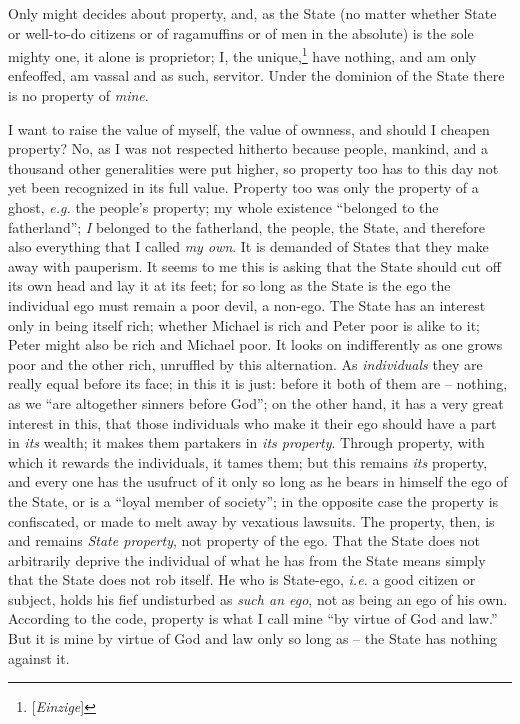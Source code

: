 Only might decides about property, and, as the State (no matter whether State 
or well-to-do citizens or of ragamuffins or of men in the absolute) is the 
sole mighty one, it alone is proprietor; I, the 
unique,\footnote{[\textit{Einzige}]} have nothing, and am only enfeoffed, am 
vassal and as such, servitor. Under the dominion of the State there is no 
property of \textit{mine}.

I want to raise the value of myself, the value of ownness, and should I 
cheapen property? No, as I was not respected hitherto because people, mankind, 
and a thousand other generalities were put higher, so property too has to this 
day not yet been recognized in its full value. Property too was only the 
property of a ghost, \textit{e.g.} the people's property; my whole existence 
``belonged to the fatherland''; \textit{I} belonged to the fatherland, the 
people, the State, and therefore also everything that I called \textit{my 
own}. It is demanded of States that they make away with pauperism. It seems to 
me this is asking that the State should cut off its own head and lay it at its 
feet; for so long as the State is the ego the individual ego must remain a 
poor devil, a non-ego. The State has an interest only in being itself rich; 
whether Michael is rich and Peter poor is alike to it; Peter might also be 
rich and Michael poor. It looks on indifferently as one grows poor and the 
other rich, unruffled by this alternation. As \textit{individuals} they are 
really equal before its face; in this it is just: before it both of them are 
-- nothing, as we ``are altogether sinners before God''; on the other hand, 
it has a very great interest in this, that those individuals who make it their 
ego should have a part in \textit{its} wealth; it makes them partakers in 
\textit{its property}. Through property, with which it rewards the 
individuals, it tames them; but this remains \textit{its} property, and every 
one has the usufruct of it only so long as he bears in himself the ego of the 
State, or is a ``loyal member of society''; in the opposite case the 
property is confiscated, or made to melt away by vexatious lawsuits. The 
property, then, is and remains \textit{State property}, not property of the 
ego. That the State does not arbitrarily deprive the individual of what he has 
from the State means simply that the State does not rob itself. He who is 
State-ego, \textit{i.e.} a good citizen or subject, holds his fief undisturbed 
as \textit{such an ego}, not as being an ego of his own. According to the 
code, property is what I call mine ``by virtue of God and law.'' But it is 
mine by virtue of God and law only so long as -- the State has nothing against 
it.

